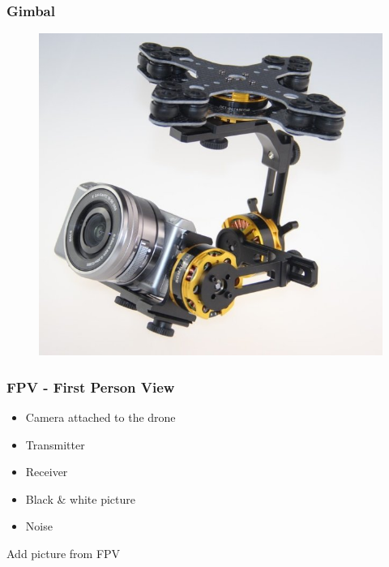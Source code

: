 \begin{frame}
\frametitle{Gimbal}

  \begin{figure}
  \includegraphics[scale=0.4]{pic/03_our-copter/gimbal.jpg}
  \end{figure}
  
\end{frame}



\begin{frame}
\frametitle{FPV - First Person View}

  \begin{itemize}
  	\item Camera attached to the drone
    \item Transmitter    
    \item Receiver   
	\item Black \& white picture
	\item Noise 
  \end{itemize}
  
\end{frame}



	Add picture from FPV
  

